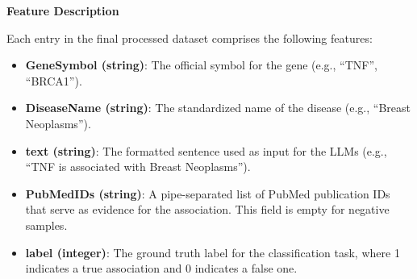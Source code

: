 \documentclass{article}
\begin{document}
\begin{table}[h]
    \centering
    \caption{Properties of the curated gene-disease association dataset.}
    \label{tab:dataset_properties}
\end{table}

\textbf{Feature Description}

Each entry in the final processed dataset comprises the following features:
\begin{itemize}
    \item \textbf{GeneSymbol (string)}: The official symbol for the gene (e.g., ``TNF'', ``BRCA1'').
    \item \textbf{DiseaseName (string)}: The standardized name of the disease (e.g., ``Breast Neoplasms'').
    \item \textbf{text (string)}: The formatted sentence used as input for the LLMs (e.g., ``TNF is associated with Breast Neoplasms'').
    \item \textbf{PubMedIDs (string)}: A pipe-separated list of PubMed publication IDs that serve as evidence for the association. This field is empty for negative samples.
    \item \textbf{label (integer)}: The ground truth label for the classification task, where 1 indicates a true association and 0 indicates a false one.
\end{itemize}
\end{document}
